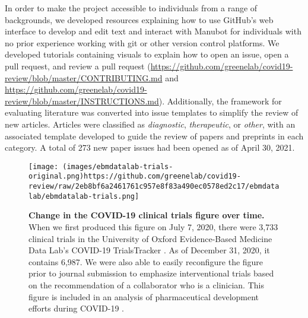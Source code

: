 \documentclass[sigconf]{acmart}
\begin{document}
In order to make the project accessible to individuals from a range of backgrounds, we developed resources explaining how to use GitHub's web interface to develop and edit text and interact with Manubot for individuals with no prior experience working with git or other version control platforms.
We developed tutorials containing visuals to explain how to open an issue, open a pull request, and review a pull request (\url{https://github.com/greenelab/covid19-review/blob/master/CONTRIBUTING.md} and \url{https://github.com/greenelab/covid19-review/blob/master/INSTRUCTIONS.md}).
Additionally, the framework for evaluating literature was converted into issue templates to simplify the review of new articles.
Articles were classified as \emph{diagnostic}, \emph{therapeutic}, or \emph{other}, with an associated template developed to guide the review of papers and preprints in each category.
A total of 273 new paper issues had been opened as of April 30, 2021.

\begin{figure}
\hypertarget{fig:ebm-trials}{%
\centering
\texttt{[image: (images/ebmdatalab-trials-original.png)https://github.com/greenelab/covid19-review/raw/2eb8bf6a2461761c957e8f83a490ec0578ed2c17/ebmdatalab/ebmdatalab-trials.png]}
\caption{\textbf{Change in the COVID-19 clinical trials figure over time.}
When we first produced this figure on July 7, 2020, there were 3,733 clinical trials in the University of Oxford Evidence-Based Medicine Data Lab's COVID-19 TrialsTracker \citep{SSbnPnzT}.
As of December 31, 2020, it contains 6,987.
We were also able to easily reconfigure the figure prior to journal submission to emphasize interventional trials based on the recommendation of a collaborator who is a clinician.
This figure is included in an analysis of pharmaceutical development efforts during COVID-19 \citep{cifK9B8t}.}\label{fig:ebm-trials}
}
\end{figure}
\end{document}
